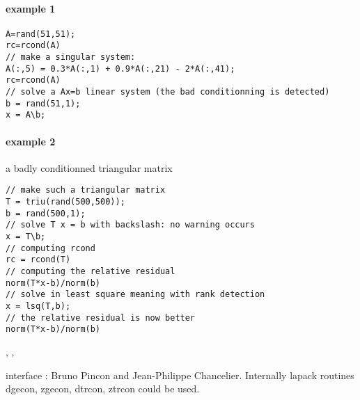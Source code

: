 \begin{examples}
\paragraph{example 1}
\begin{Verbatim}
A=rand(51,51);
rc=rcond(A)
// make a singular system:
A(:,5) = 0.3*A(:,1) + 0.9*A(:,21) - 2*A(:,41);
rc=rcond(A)
// solve a Ax=b linear system (the bad conditionning is detected)
b = rand(51,1);
x = A\b;
\end{Verbatim}

\paragraph{example 2} a badly conditionned triangular matrix
\begin{Verbatim}
// make such a triangular matrix
T = triu(rand(500,500));
b = rand(500,1);
// solve T x = b with backslash: no warning occurs
x = T\b;
// computing rcond
rc = rcond(T)
// computing the relative residual
norm(T*x-b)/norm(b)
// solve in least square meaning with rank detection
x = lsq(T,b);
// the relative residual is now better
norm(T*x-b)/norm(b)
\end{Verbatim}
\end{examples}

\begin{manseealso}
  , ,   
\end{manseealso}

\begin{authors}
   interface : Bruno Pincon and Jean-Philippe Chancelier. Internally
   lapack routines dgecon, zgecon, dtrcon, ztrcon could be used.
\end{authors}
